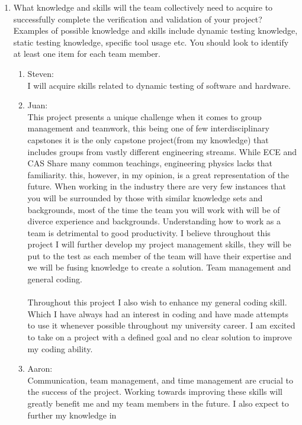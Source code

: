 \documentclass[12pt, titlepage]{article}
\begin{document}
\begin{enumerate}
  \item What knowledge and skills will the team collectively need to acquire to
  successfully complete the verification and validation of your project?
  Examples of possible knowledge and skills include dynamic testing knowledge,
  static testing knowledge, specific tool usage etc.  You should look to
  identify at least one item for each team member.

  \begin{enumerate}
    \item{Steven:}\\
    I will acquire skills related to dynamic testing of software and hardware. \\
    \item{Juan:}\\
    This project presents a unique challenge when it comes to group management and teamwork, this being one of few interdisciplinary capstones it is the only 
    capstone project(from my knowledge) that includes groups from vastly different engineering streams. While ECE and CAS Share many common teachings, engineering physics lacks that familiarity.
    this, however, in my opinion, is a great representation of the future. When working in the industry there are very few instances that you will be surrounded by those with similar knowledge sets 
    and backgrounds, most of the time the team you will work with will be of diverce experience and backgrounds. Understanding how to work as a team is detrimental to good productivity. I believe throughout this 
    project I will further develop my project management skills, they will be put to the test as each member of the team will have their expertise and we will be fusing knowledge to create a solution.
    Team management and general coding.\\
    \\
    Throughout this project I also wish to enhance my general coding skill. Which I have always had an interest in coding and have made attempts to use it whenever possible throughout my university career. I am excited to 
    take on a project with a defined goal and no clear solution to improve my coding ability.
    \item{Aaron:}\\
    Communication, team management, and time management are 
    crucial to the success of the project. Working towards improving these skills will
    greatly benefit me and my team members in the future. I also expect to further my knowledge in

\end{enumerate}
\end{enumerate}
\end{document}
